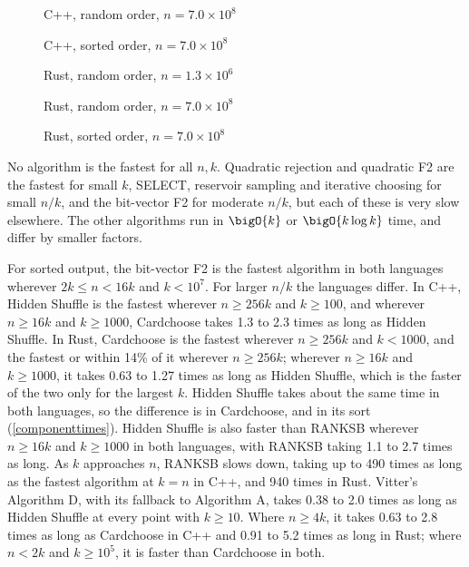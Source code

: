 \documentclass[letterpaper,11pt]{article}
\begin{document}
\begin{figure}
    
    \caption{C++, random order, \(n=7.0 \times 10^{8}\)}
    \label{cpprandomlargen}
\end{figure}

\begin{figure}
    
    \caption{C++, sorted order, \(n=7.0 \times 10^{8}\)}
    \label{cppsortedlargen}
\end{figure}

\begin{figure}
    
    \caption{Rust, random order, \(n=1.3 \times 10^{6}\)}
    \label{rustrandomsmalln}
\end{figure}

\begin{figure}
    
    \caption{Rust, random order, \(n=7.0 \times 10^{8}\)}
    \label{rustrandomlargen}
\end{figure}

\begin{figure}
    
    \caption{Rust, sorted order, \(n=7.0 \times 10^{8}\)}
    \label{rustsortedlargen}
\end{figure}

No algorithm is the fastest for all \(n, k\). Quadratic rejection
and quadratic F2 are the fastest for small \(k\), SELECT, reservoir
sampling and iterative choosing for small \(n/k\), and the bit-vector
F2 for moderate \(n/k\), but each of these is very slow elsewhere. The
other algorithms run in \(\bigO{k}\) or \(\bigO{k \log k}\) time, and
differ by smaller factors.

For sorted output, the bit-vector F2 is the fastest algorithm in both
languages wherever \(2k \leq n < 16k\) and \(k < 10^7\). For larger
\(n/k\) the languages differ. In C++, Hidden Shuffle is the fastest
wherever \(n \geq 256k\) and \(k \geq 100\), and wherever
\(n \geq 16k\) and \(k \geq 1000\), Cardchoose takes 1.3 to 2.3 times
as long as Hidden Shuffle. In Rust, Cardchoose is the fastest wherever
\(n \geq 256k\) and \(k < 1000\), and the fastest or within 14\% of it
wherever \(n \geq 256k\); wherever \(n \geq 16k\) and \(k \geq 1000\),
it takes 0.63 to 1.27 times as long as Hidden Shuffle, which is the
faster of the two only for the largest \(k\). Hidden Shuffle takes
about the same time in both languages, so the difference is in
Cardchoose, and in its sort (\autoref{componenttimes}). Hidden Shuffle
is also faster than RANKSB wherever \(n \geq 16k\) and \(k \geq 1000\)
in both languages, with RANKSB taking 1.1 to 2.7 times as long. As
\(k\) approaches \(n\), RANKSB slows down, taking up to 490 times as
long as the fastest algorithm at \(k = n\) in C++, and 940 times in
Rust. Vitter's
Algorithm D, with its fallback to Algorithm A, takes 0.38 to 2.0 times
as long as Hidden Shuffle at every point with \(k \geq 10\). Where
\(n \geq 4k\), it takes 0.63 to 2.8 times as long as Cardchoose in C++
and 0.91 to 5.2 times as long in Rust; where \(n < 2k\) and
\(k \geq 10^5\), it is faster than Cardchoose in both.
\end{document}

